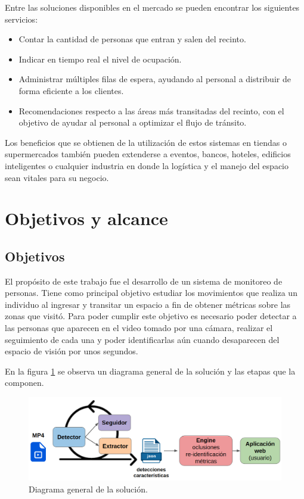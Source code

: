 Entre las soluciones disponibles en el mercado se pueden encontrar los siguientes servicios:
\begin{itemize}
\item Contar la cantidad de personas que entran y salen del recinto.
\item Indicar en tiempo real el nivel de ocupación.
\item Administrar múltiples filas de espera, ayudando al personal a distribuir de forma eficiente a los clientes.
\item Recomendaciones respecto a las áreas más transitadas del recinto, con el objetivo de ayudar al personal a optimizar el flujo de tránsito.
\end{itemize}

Los beneficios que se obtienen de la utilización de estos sistemas en tiendas o supermercados también pueden extenderse a eventos, bancos, hoteles, edificios inteligentes o cualquier industria en donde la logística y el manejo del espacio sean vitales para su negocio.


\section{Objetivos y alcance}
\label{sec:objetivosAlcance}

\subsection{Objetivos}

El propósito de este trabajo fue el desarrollo de un sistema de monitoreo de personas. Tiene como principal objetivo estudiar los movimientos que realiza un individuo al ingresar y transitar un espacio a fin de obtener métricas sobre las zonas que visitó. Para poder cumplir este objetivo es necesario poder detectar a las personas que aparecen en el video tomado por una cámara, realizar el seguimiento de cada una y poder identificarlas aún cuando desaparecen del espacio de visión por unos segundos.

En la figura \ref{fig:esquemaGeneral} se observa un diagrama general de la solución y las etapas que la componen.

\begin{figure}[ht]
	\centering
	\includegraphics[scale=.6]{./Figures/esquemaGeneral.png}
	\caption{Diagrama general de la solución.}
	\label{fig:esquemaGeneral}
\end{figure}

